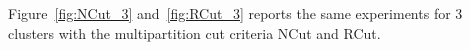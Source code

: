 Figure~\ref{fig:NCut_3} and~\ref{fig:RCut_3} reports the same experiments for 3 clusters with the multipartition cut criteria NCut and RCut. 
\begin{figure}[htbp]
\begin{minipage}[t]{0.5\linewidth}
\centering
{}


\end{minipage}
\end{figure}
